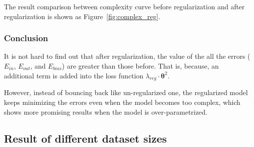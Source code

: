 \documentclass[12pt,letterpaper]{article}
\begin{document}
The result comparison between complexity curve before regularization and after regularization is shown as Figure~\ref{fig:complex_reg}.

\subsubsection*{Conclusion}

It is not hard to find out that after regularization, the value of the all the errors ($E_{in}$, $E_{out}$, and $E_{bias}$) are greater than those before. That is, because, an additional term is added into the loss function $\lambda_{reg} \cdot {\boldsymbol{ \theta} }^2$.

However, instead of bouncing back like un-regularized one, the regularized model keeps minimizing the errors even when the model becomes too complex, which shows more promising results when the model is over-parametrized.


\subsection{Result of different dataset sizes}
\end{document}
